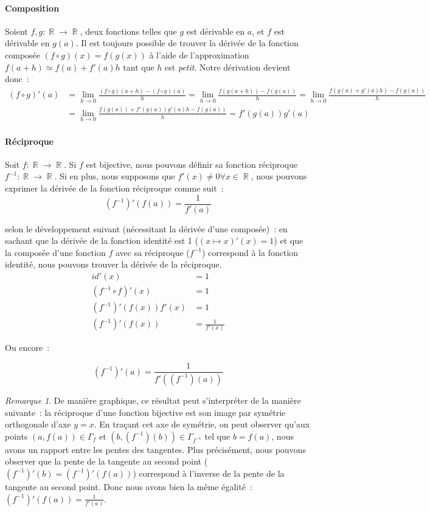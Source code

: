 \documentclass{article}
\DeclareMathOperator{\R}{\mathbb R}
\theoremstyle{definition}
\theoremstyle{remark}
\newtheorem*{rmq}{Remarque}
\begin{document}
		\paragraph{Composition}
			Soient $f, g : \R \to \R$, deux fonctions telles que $g$ est dérivable en $a$, et $f$ est dérivable en $g(a)$.
			Il est toujours possible de trouver la dérivée de la fonction composée $(f \circ g)(x) = f(g(x))$ à l'aide de l'approximation
			$f(a+h) \simeq f(a) + f'(a)h$ tant que $h$ est \textit{petit}. Notre dérivation devient donc~:
			\[
				\begin{aligned}
					(f \circ g)'(a) &= \lim_{h \to 0}\frac {(f \circ g)(a+h) - (f \circ g)(a)}{h} = \lim_{h \to 0}\frac {f(g(a+h)) - f(g(a))}{h}
					= \lim_{h \to 0}\frac {f(g(a) + g'(a)h) - f(g(a))}{h} \\
									&= \lim_{h \to 0}\frac {f(g(a)) + f'(g(a))g'(a)h - f(g(a))}{h} = f'(g(a))g'(a)
				\end{aligned}
			\]

		\paragraph{Réciproque}
			Soit $f : \R \to \R$. Si $f$ est bijective, nous pouvons définir sa fonction réciproque $f^{-1} : \R \to \R$.
			Si en plus, nous supposons que $f'(x) \neq 0 \forall x \in \R$, nous pouvons exprimer la dérivée de la fonction
			réciproque comme suit~:
			\[(f^{-1})'(f(a)) = \frac {1}{f'(a)}\]

			selon le développement suivant (nécessitant la dérivée d'une composée)~: en sachant que la dérivée de la fonction identité
			est 1 ($(x \mapsto x)'(x) = 1$) et que la composée d'une fonction $f$ avec sa réciproque ($f^{-1}$) correspond à la
			fonction identité, nous pouvons trouver la dérivée de la réciproque.
			\[
				\begin{aligned}
					id'(x) &= 1 \\
					(f^{-1} \circ f)'(x) &= 1 \\
					(f^{-1})'(f(x))f'(x) &= 1 \\
					(f^{-1})'(f(x)) &= \frac {1}{f'(x)}
				\end{aligned}
			\]

			Ou encore~:

			\[(f^{-1})'(a) = \frac {1}{f'((f^{-1})(a))}\]

		\begin{rmq} De manière graphique, ce résultat peut s'interpréter de la manière suivante~: la réciproque d'une fonction bijective est son image par
		symétrie orthogonale d'axe $y = x$. En traçant cet axe de symétrie, on peut observer qu'aux points $(a, f(a)) \in \Gamma_f$ et
		$(b, (f^{-1})(b)) \in \Gamma_{f^{-1}}$ tel que $b = f(a)$, nous avons un rapport entre les pentes des tangentes. Plus précisément, nous pouvons
		observer que la pente de la tangente au second point ($(f^{-1})'(b) = (f^{-1})'(f(a))$) correspond à l'inverse de la pente de la tangente au second
		point. Donc nous avons bien la même égalité~: $(f^{-1})'(f(a)) = \frac {1}{f'(a)}$. \end{rmq}
\end{document}
